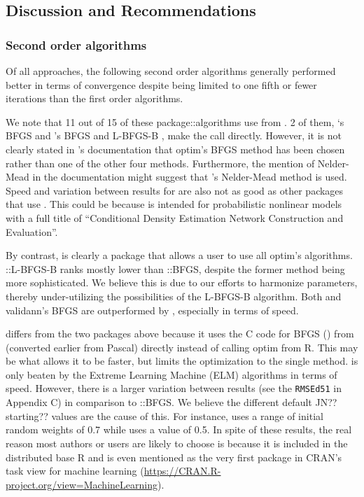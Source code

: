 \hypertarget{discussion-and-recommendations}{%
\subsection{Discussion and
Recommendations}\label{discussion-and-recommendations}}

\hypertarget{second-order-algorithms}{%
\subsubsection{Second order algorithms}\label{second-order-algorithms}}

Of all approaches, the following second order algorithms generally
performed better in terms of convergence despite being limited to one
fifth or fewer iterations than the first order algorithms.

We note that 11 out of 15 of these package::algorithms use 
from . 2 of them, `s BFGS
\citep{R-CaDENCE} and 's BFGS and L-BFGS-B
\citep{R-validann}, make the call directly. However, it is not clearly
stated in 's documentation that optim's BFGS method has
been chosen rather than one of the other four methods. Furthermore, the
mention of Nelder-Mead in the documentation might suggest that
's Nelder-Mead method is used. Speed and variation between
results for  are also not as good as other packages
that use . This could be because  is
intended for probabilistic nonlinear models with a full title of
``Conditional Density Estimation Network Construction and Evaluation''.

By contrast,  is clearly a package that allows a user
to use all optim's algorithms. ::L-BFGS-B ranks mostly
lower than ::BFGS, despite the former method being
more sophisticated. We believe this is due to our efforts to harmonize
parameters, thereby under-utilizing the possibilities of the L-BFGS-B
algorithm. Both  and validann's BFGS are outperformed
by , especially in terms of speed.

 \citep{R-nnet} differs from the two packages above
because it uses the C code for BFGS () from 
(converted earlier from Pascal) directly instead of calling optim from
R. This may be what allows it to be faster, but limits the optimization
to the single method.  is only beaten by the Extreme
Learning Machine (ELM) algorithms in terms of speed. However, there is a
larger variation between results (see the \texttt{RMSEd51} in Appendix
C) in comparison to ::BFGS. We believe the different
default JN?? starting?? values are the cause of this. For instance,
 uses a range of initial random weights of 0.7 while
 uses a value of 0.5. In spite of these results, the
real reason most authors or users are likely to choose  is
because it is included in the distributed base R and is even mentioned
as the very first package in CRAN's task view for machine learning
(\url{https://CRAN.R-project.org/view=MachineLearning}).

